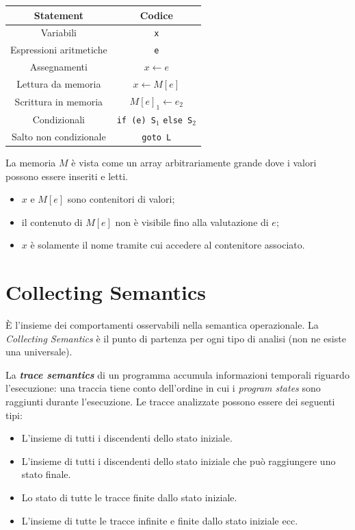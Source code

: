 \documentclass[a4paper, 11pt]{report}
\begin{document}
	\begin{center}
		\begin{tabular}{cc}
			\hline
			\textbf{Statement} & \textbf{Codice} \\
			\hline
			\hline
			Variabili & \lstinline|x| \\
			Espressioni aritmetiche & \lstinline|e| \\
			Assegnamenti & $x \leftarrow e$ \\
			Lettura da memoria & $x \leftarrow M[e]$ \\
			Scrittura in memoria & $M[e]_1 \leftarrow e_2$ \\
			Condizionali & \lstinline|if (e) S|$_1$ \lstinline|else S|$_2$ \\
			Salto non condizionale & \lstinline|goto L|\\
			\hline
		\end{tabular}
	\end{center}
	
	La memoria $M$ è vista come un array arbitrariamente grande dove i valori possono essere inseriti e letti.
	
	\begin{itemize}
		\item $x$ e $M[e]$ sono contenitori di valori;
		\item il contenuto di $M[e]$ non è visibile fino alla valutazione di $e$;
		\item $x$ è solamente il nome tramite cui accedere al contenitore associato.
	\end{itemize}


	
	\section*{Collecting Semantics}
	\MakeUppercase{è} l'insieme dei comportamenti osservabili nella semantica operazionale. La \textit{Collecting Semantics} è il punto di partenza per ogni tipo di analisi (non ne esiste una universale).
	
	La \textbf{\textit{trace semantics}} di un programma accumula informazioni temporali riguardo l'esecuzione: una traccia tiene conto dell'ordine in cui i \textit{program states} sono raggiunti durante l'esecuzione.
	\noindent
	Le tracce analizzate possono essere dei seguenti tipi:
	\begin{itemize}
		\item L'insieme di tutti i discendenti dello stato iniziale.
		\item L'insieme di tutti i discendenti dello stato iniziale che può raggiungere uno stato finale.
		\item Lo stato di tutte le tracce finite dallo stato iniziale.
		\item L'insieme di tutte le tracce infinite e finite dallo stato iniziale ecc.
	\end{itemize}
	
\end{document}
